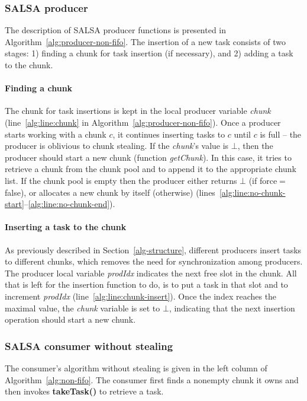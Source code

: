 \subsubsection {SALSA producer}

The description of SALSA producer functions is presented in Algorithm~\ref{alg:producer-non-fifo}. 
The insertion of a new task consists of two stages: 
1) finding a chunk for task insertion (if necessary), and 2) adding a task to the chunk. 
\paragraph {Finding a chunk}
The chunk for task insertions is kept in the local producer variable \emph{chunk} (line~\ref{alg:line:chunk} in Algorithm~\ref{alg:producer-non-fifo}). 
Once a producer starts working with a chunk $c$, it continues inserting tasks to $c$ until $c$ is full -- 
the producer is oblivious to chunk stealing. 
If the \emph{chunk}'s value is $\bot$, then the producer should start a new chunk (function \emph{getChunk}). 
In this case, it tries to retrieve a chunk from the chunk pool and to append it to the appropriate chunk list. If the chunk pool is empty then the producer either returns $\bot$ (if force$=$false), or allocates a new chunk by itself (otherwise) (lines~\ref{alg:line:no-chunk-start}--\ref{alg:line:no-chunk-end}). 
\paragraph {Inserting a task to the chunk}
As previously described in Section~\ref{alg-structure}, different producers insert tasks to different chunks, which removes the need for synchronization among producers. 
The producer local variable \emph{prodIdx} indicates the next free slot in the chunk.
All that is left for the insertion function to do, is to put a task in that slot and to increment \emph{prodIdx} (line~\ref{alg:line:chunk-insert}).
Once the index reaches the maximal value, the \emph{chunk} variable is set to $\bot$, indicating that the next insertion operation should start a new chunk. 
\subsubsection {SALSA consumer without stealing}

The consumer's algorithm without stealing is given in the left column of Algorithm~\ref{alg:non-fifo}.
The consumer first finds a nonempty chunk it owns and then invokes {\bf takeTask()} to retrieve a task.

